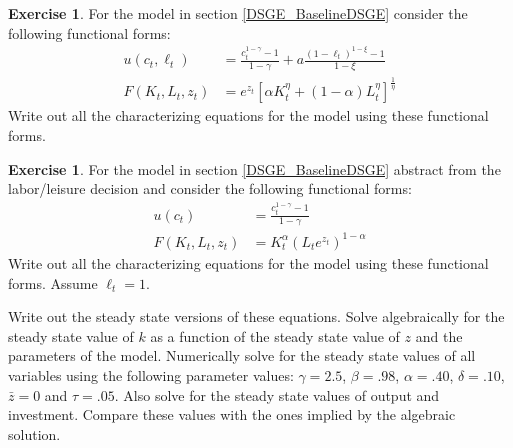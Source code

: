 \documentclass[letterpaper,12pt]{article}
\theoremstyle{definition}
\newtheorem{exercise}[theorem]{Exercise}
\begin{document}
\begin{spacing}{1.5}
	\begin{exercise} \label{DSGE_HW_CharEq_CES}
		For the model in section \ref{DSGE_BaselineDSGE} consider the following functional forms:
		\begin{equation}\label{DSGE_HW_CharEq_CES_eq01}
		\begin{split}
		u(c_t,\ell_t) & = \frac{c^{1-\gamma}_t -1}{1-\gamma}+ a \frac{(1-\ell_t)^{1-\xi}-1}{1-\xi}      \\
		F(K_t,L_t,z_t) & = e^{z_t}\left[\alpha K^{\eta}_t +(1-\alpha)L^{\eta}_t \right]^{\frac{1}{\eta}}   \nonumber
		\end{split}
		\end{equation}
		Write out all the characterizing equations for the model using these functional forms.
	\end{exercise}

	\begin{exercise} \label{DSGE_HW_NoLeisure}
		For the model in section \ref{DSGE_BaselineDSGE} abstract from the labor/leisure decision and consider the following functional forms:
		\begin{equation}\label{DSGE_HW_NoLeisure_eq01}
		\begin{split}
		u(c_t) & = \frac{c^{1-\gamma}_t -1}{1-\gamma}      \\
		F(K_t,L_t,z_t) & = K^{\alpha}_t (L_te^{z_t})^{1-\alpha}  \nonumber
		\end{split}
		\end{equation}
		Write out all the characterizing equations for the model using these functional forms.  Assume $\ell_t=1$.

		Write out the steady state versions of these equations.  Solve algebraically for the steady state value of $k$ as a function of the steady state value of $z$ and the parameters of the model.  Numerically solve for the steady state values of all variables using the following parameter values: $\gamma = 2.5$, $\beta = .98$, $\alpha = .40$, $\delta = .10$, $\bar z = 0$ and $\tau = .05$.  Also solve for the steady state values of output and investment.  Compare these values with the ones implied by the algebraic solution.
	\end{exercise}


\end{spacing}
\end{document}
